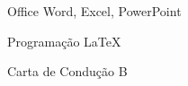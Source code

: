 

\begin{cvskills}

  \cvskill
    {Office} %
    {Word, Excel, PowerPoint} %

  \cvskill
    {Programação} %
    {LaTeX} %

  \cvskill
    {Carta de Condução} %
    {B} %

\end{cvskills}
